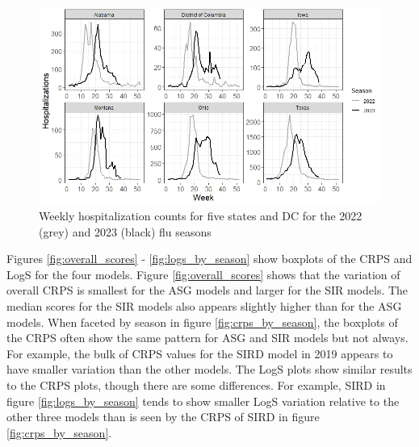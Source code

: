 \documentclass[ba]{imsart}
\theoremstyle{plain}
\theoremstyle{definition}
\theoremstyle{remark}
\begin{document}
\begin{supplement}
\begin{figure}[hbt!]
    \centering
    \includegraphics[scale=.65]{Images/hosp_vs_week.png}
    \caption{Weekly hospitalization counts for five states and DC for the 2022 (grey) and 2023 (black) flu seasons}
    \label{fig:hosp_vs_week}
\end{figure}





% 






Figures \ref{fig:overall_scores} - \ref{fig:logs_by_season} show boxplots of the CRPS and LogS for the four models. Figure \ref{fig:overall_scores} shows that the variation of overall CRPS is smallest for the ASG models and larger for the SIR models. The median scores for the SIR models also appears slightly higher than for the ASG models. 
When faceted by season in figure \ref{fig:crps_by_season}, the boxplots of the CRPS often show the same pattern for ASG and SIR models but not always. For example, the bulk of CRPS values for the SIRD model in 2019 appears to have smaller variation than the other models.
The LogS plots show similar results to the CRPS plots, though there are some differences. For example, SIRD in figure \ref{fig:logs_by_season} tends to show smaller LogS variation relative to the other three models than is seen by the CRPS of SIRD in figure \ref{fig:crps_by_season}.


\end{supplement}
\end{document}
